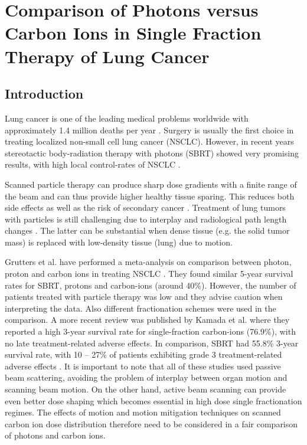 \documentclass[type=dr, dr=rernat, acm$^3$entcolor=tud7b,colorbacktitle, bigchapter, openright, twoside, 12pt ]{tudthesis}
\begin{document}
\chapter{Comparison of Photons versus Carbon Ions in Single Fraction Therapy of Lung Cancer}
\label{PatStudy}


\section{Introduction}

Lung cancer is one of the leading medical problems worldwide with approximately 1.4 million deaths per year \cite{Siegel2014}. Surgery is usually the first choice in treating localized non-small cell lung cancer (NSCLC). However, in recent years stereotactic body-radiation therapy with photons (SBRT) showed very promising results, with high local control-rates of NSCLC \cite{Baumann2009, Fakiris2009, Grutters2010, Ricardi2010, Timmerman2010, Greco2011}.

Scanned particle therapy can produce sharp dose gradients with a finite range of the beam and can thus provide higher healthy tissue sparing. This reduces both side effects as well as the risk of secondary cancer \cite{Newhauser2011}. Treatment of lung tumors with particles is still challenging due to interplay and radiological path length changes \cite{Bert2011}.
The latter can be substantial when dense tissue (e.g. the solid tumor mass) is replaced with low-density tissue (lung) due to motion.

Grutters et al. have performed a meta-analysis on comparison between photon, proton and carbon ions in treating NSCLC \cite{Grutters2010}.
They found similar 5-year survival rates for SBRT, protons and carbon-ions (around 40\%). However, the number of patients treated with
particle therapy was low and they advise caution when interpreting the data. Also different fractionation schemes were used in the
comparison. A more recent review was published by  Kamada et al. \cite{Kamada2016} where they reported a high 3-year survival rate for
single-fraction carbon-ions (76.9\%), with no late treatment-related adverse effects. In comparison, SBRT had 55.8\% 3-year survival rate,
with 10 – 27\% of patients exhibiting grade 3 treatment-related adverse effects \cite{Timmerman2010}. It is important to note that all
of these studies used passive beam scattering, avoiding the problem of interplay between organ motion and scanning beam motion.
On the other hand, active beam scanning can provide even better dose shaping which becomes essential in high dose single fractionation
regimes. The effects of motion and motion mitigation techniques on scanned carbon ion dose distribution therefore need to be considered 
in a fair comparison of photons and carbon ions. 
\end{document}
